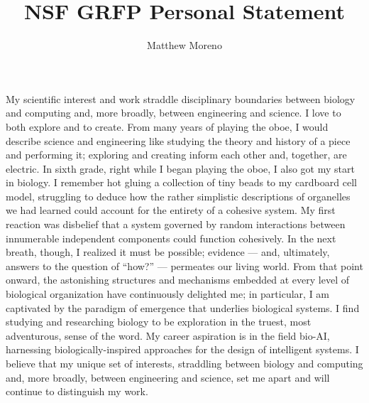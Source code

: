 \documentclass[12pt]{book}
\title{NSF GRFP Personal Statement}
\author{Matthew Moreno}
\begin{document}

My scientific interest and work straddle disciplinary boundaries between biology and computing and, more broadly, between engineering and science.
I love to both explore and to create.
From many years of playing the oboe, I would describe science and engineering like studying the theory and history of a piece and performing it; exploring and creating inform each other and, together, are electric.
In sixth grade, right while I began playing the oboe, I also got my start in biology.
I remember hot gluing a collection of tiny beads to my cardboard cell model, struggling to deduce how the rather simplistic descriptions of organelles we had learned could account for the entirety of a cohesive system.
My first reaction was disbelief that a system governed by random interactions between innumerable independent components could function cohesively.
In the next breath, though, I realized it must be possible; evidence --- and, ultimately, answers to the question of ``how?'' --- permeates our living world.
From that point onward, the astonishing structures and mechanisms embedded at every level of biological organization have continuously delighted me;
in particular, I am captivated by the paradigm of emergence that underlies biological systems.
I find studying and researching biology to be exploration in the truest, most adventurous, sense of the word.
My career aspiration is in the field bio-AI, harnessing biologically-inspired approaches for the design of intelligent systems.
I believe that my unique set of interests, straddling between biology and computing and, more broadly, between engineering and science, set me apart and will continue to distinguish my work.
\end{document}
